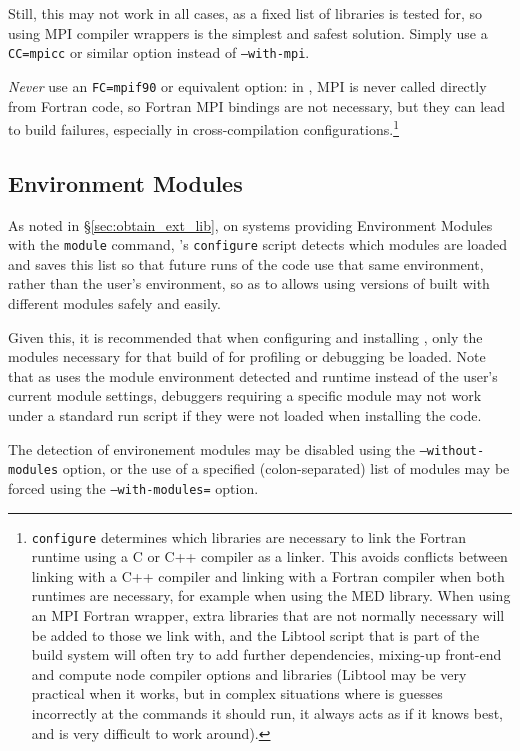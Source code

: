 \documentclass[a4paper,10pt,twoside]{csshortdoc}
\begin{document}
Still, this may not work in all cases, as a fixed list of libraries
is tested for, so using MPI compiler wrappers is the simplest and safest
solution. Simply use a \texttt{CC=mpicc} or similar option instead
of \texttt{--with-mpi}.

\emph{Never} use an \texttt{FC=mpif90} or equivalent option:
in \CS, MPI is never called directly from Fortran code,
so Fortran MPI bindings are not necessary, but they can lead to
build failures, especially in cross-compilation
configurations.\footnote{\texttt{configure} determines which libraries are
necessary to link the Fortran runtime using a C or C++ compiler as a linker.
This avoids conflicts between linking with a C++ compiler and linking with a
Fortran compiler when both runtimes are necessary,
for example when using the MED library.
When using an MPI Fortran wrapper, extra libraries that are not normally
necessary will be added to those we link with, and the Libtool script
that is part of the build system will often try to add further dependencies,
mixing-up front-end and compute node compiler options and
libraries (Libtool may be very practical when it works, but in complex
situations where is guesses incorrectly at the commands it should run, it always
acts as if it knows best, and is very difficult to work around).}

\subsection{Environment Modules\label{sec:config:envmode}}

As noted in \S\ref{sec:obtain_ext_lib}, on systems providing
Environment Modules with the {\tt module} command, \CS's {\tt configure}
script detects which modules are loaded and saves
this list so that future runs of the code use that same environment,
rather than the user's environment, so as to allows using versions of
\CS built with different modules safely and easily.

Given this, it is recommended that when configuring and installing
\CS, only the modules necessary for that build of for
profiling or debugging be loaded. Note that as \CS uses the module
environment detected and runtime instead of the user's current
module settings, debuggers requiring a specific module may
not work under a standard run script if they were not loaded when
installing the code.

The detection of environement modules may be disabled using the
\texttt{--without-modules} option,
or the use of a specified (colon-separated) list of modules
may be forced using the \texttt{--with-modules=} option.
\end{document}
